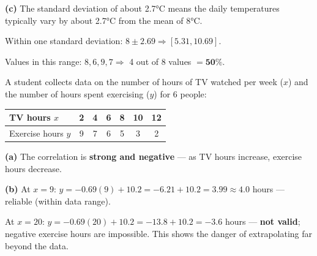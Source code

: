 \documentclass[addpoints]{exam}
\begin{document}
\begin{questions}
\begin{solution}[11cm]
\textbf{(c)} The standard deviation of about 2.7°C means the daily temperatures typically vary by
about 2.7°C from the mean of 8°C.

Within one standard deviation: $8 \pm 2.69 \Rightarrow [5.31, 10.69]$.

Values in this range: $8, 6, 9, 7 \Rightarrow$ 4 out of 8 values $= \mathbf{50\%}$.
\end{solution}

\question[8] A student collects data on the number of hours of TV watched per week ($x$) and
the number of hours spent exercising ($y$) for 6 people:

\begin{center}
\begin{tabular}{@{}lcccccc@{}}
\toprule
TV hours $x$ & 2 & 4 & 6 & 8 & 10 & 12 \\
\midrule
Exercise hours $y$ & 9 & 7 & 6 & 5 & 3 & 2 \\
\bottomrule
\end{tabular}
\end{center}
\begin{solution}[9cm]
\textbf{(a)} The correlation is \textbf{strong and negative} — as TV hours increase, exercise hours decrease.

\textbf{(b)} At $x = 9$: $y = -0.69(9) + 10.2 = -6.21 + 10.2 = \mathbf{3.99 \approx 4.0}$ hours — reliable (within data range).

At $x = 20$: $y = -0.69(20) + 10.2 = -13.8 + 10.2 = \mathbf{-3.6}$ hours — \textbf{not valid}; negative exercise hours are impossible. This shows the danger of extrapolating far beyond the data.


\end{solution}
\end{questions}
\end{document}
